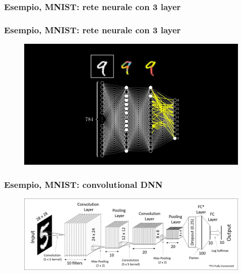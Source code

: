 \begin{frame}

	\frametitle{Esempio, MNIST: rete neurale con 3 layer}

		\centering

\end{frame}


\begin{frame}

	\frametitle{Esempio, MNIST: rete neurale con 3 layer}

	\begin{figure}[!htbp]
		\centering
		\includegraphics[width=1.0\linewidth]{images/supervised/z_algorithms_deep_learning/mnist_3layers_splits.jpg}
	\end{figure}


\end{frame}


\begin{frame}

	\frametitle{Esempio, MNIST: convolutional DNN}

	\begin{figure}[!htbp]
		\centering
		\includegraphics[width=1.0\linewidth]{images/supervised/z_algorithms_deep_learning/mnist_dnn.png}
	\end{figure}


\end{frame}


%
%
%
